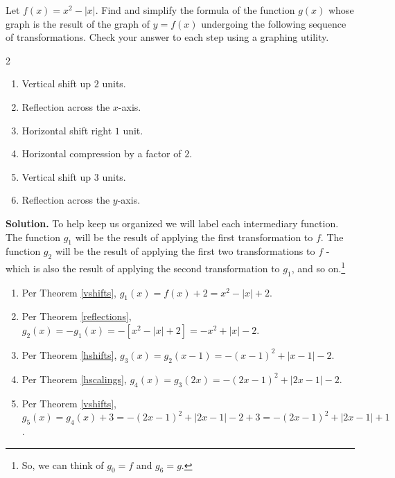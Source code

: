 \documentclass{ximera}
\begin{document}
\begin{example}  \label{graphingcalctrans} Let $f(x) = x^2 - |x|$.  Find and simplify the formula of the function $g(x)$ whose graph is the result of the graph of $y=f(x)$ undergoing the following sequence of transformations. Check your answer to each step using a graphing utility.
\begin{multicols}{2}
\begin{enumerate}

\item  Vertical shift up $2$ units.

\item  Reflection across the $x$-axis.

\item  Horizontal shift right $1$ unit.

\item  Horizontal compression by a factor of $2$.

\item  Vertical shift up $3$ units.

\item  Reflection across the $y$-axis.

\end{enumerate}
\end{multicols}

{\bf Solution.}  To help keep us organized we will label each intermediary function.  The function $g_{1}$ will be the result of applying the first transformation to $f$.  The function $g_{2}$ will be the result of applying the first two transformations to $f$ - which is also the result of applying the second transformation to $g_{1}$, and so on.\footnote{So, we can think of $g_{0} = f$ and $g_{6} = g$.}

\begin{enumerate}

\item  Per Theorem \ref{vshifts}, $g_{1}(x) = f(x) + 2 = x^2-|x|+2$.

\item  Per Theorem \ref{reflections}, $g_{2}(x) = -g_{1}(x) =  -[x^2-|x|+2] = -x^2+|x|-2$.

\item  Per Theorem \ref{hshifts}, $g_{3}(x) = g_{2}(x-1) = -(x-1)^2+|x-1|-2$.

\item  Per Theorem \ref{hscalings}, $g_{4}(x) = g_{3}(2x) = -(2x-1)^2+|2x-1| - 2$.

\item  Per Theorem \ref{vshifts}, $g_{5}(x) = g_{4}(x)+3 =  -(2x-1)^2+|2x-1| - 2 + 3 =  -(2x-1)^2+|2x-1| +1$.


\end{enumerate}
\end{example}
\end{document}
